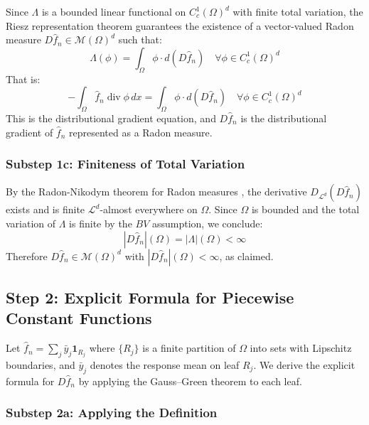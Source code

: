 \documentclass[12pt,a4paper]{article}
\numberwithin{equation}{section}
\theoremstyle{plain}
\theoremstyle{definition}
\newcommand{\fn}{\hat{f}_n}
\begin{document}
	Since $\Lambda$ is a bounded linear functional on $C_c^1(\Omega)^d$ with
	finite total variation, the Riesz representation theorem
	\citep[Theorem~1.38]{evans2015measure} guarantees the existence of a
	vector-valued Radon measure $D\fn \in \mathcal{M}(\Omega)^d$ such that:
	\begin{equation}
		\Lambda(\phi) = \int_\Omega \phi \cdot d(D\fn)
		\quad \forall \phi \in C_c^1(\Omega)^d
	\end{equation}
	That is:
	\begin{equation}
		-\int_\Omega \fn \operatorname{div} \phi \, dx
		= \int_\Omega \phi \cdot d(D\fn)
		\quad \forall \phi \in C_c^1(\Omega)^d
	\end{equation}
	This is the distributional gradient equation, and $D\fn$ is the
	distributional gradient of $\fn$ represented as a Radon measure.
	
	\subsubsection*{Substep 1c: Finiteness of Total Variation}
	
	By the Radon-Nikodym theorem for Radon measures
	\citep[Theorem~1.29]{evans2015measure}, the derivative $D_{\mathcal{L}^d}(D\fn)$
	exists and is finite $\mathcal{L}^d$-almost everywhere on $\Omega$. Since
	$\Omega$ is bounded and the total variation of $\Lambda$ is finite by the
	$BV$ assumption, we conclude:
	\begin{equation}
		|D\fn|(\Omega) = |\Lambda|(\Omega) < \infty
	\end{equation}
	Therefore $D\fn \in \mathcal{M}(\Omega)^d$ with $|D\fn|(\Omega) < \infty$,
	as claimed.
	
	\subsection{Step 2: Explicit Formula for Piecewise Constant Functions}
	
	Let $\fn = \sum_j \bar{y}_j \mathbf{1}_{R_j}$ where $\{R_j\}$ is a finite
	partition of $\Omega$ into sets with Lipschitz boundaries, and $\bar{y}_j$
	denotes the response mean on leaf $R_j$. We derive the explicit formula for
	$D\fn$ by applying the Gauss--Green theorem to each leaf.
	
	\subsubsection*{Substep 2a: Applying the Definition}
	
\end{document}
